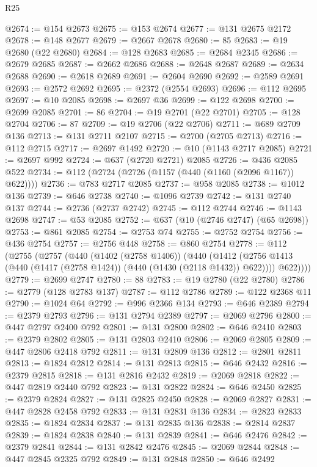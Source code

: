 \begin{lexlean}{R25}
\begin{coremodule}
@2674 := @154 @2673
@2675 := @153 @2674
@2677 := @131 @2675 @2172
@2678 := @148 @2677
@2679 := @2667 @2678
@2680 := 85
@2683 := @19 @2680 (@22 @2680)
@2684 := @128 @2683
@2685 := @2684 @2345
@2686 := @2679 @2685
@2687 := @2662 @2686
@2688 := @2648 @2687
@2689 := @2634 @2688
@2690 := @2618 @2689
@2691 := @2604 @2690
@2692 := @2589 @2691
@2693 := @2572 @2692
@2695 := @2372 (@2554 @2693)
@2696 := @112 @2695
@2697 := @10 @2085
@2698 := @2697 @36
@2699 := @122 @2698
@2700 := @2699 @2085
@2701 := 86
@2704 := @19 @2701 (@22 @2701)
@2705 := @128 @2704
@2706 := 87
@2709 := @19 @2706 (@22 @2706)
@2711 := @689 @2709 @136
@2713 := @131 @2711 @2107
@2715 := @2700 (@2705 @2713)
@2716 := @112 @2715
@2717 := @2697 @1492
@2720 := @10 (@1143 @2717 @2085)
@2721 := @2697 @992
@2724 := @637 (@2720 @2721) @2085
@2726 := @436 @2085 @522
@2734 := @112 (@2724 (@2726 (@1157 (@440 (@1160 (@2096 @1167)) @622))))
@2736 := @783 @2717 @2085
@2737 := @958 @2085
@2738 := @1012 @136
@2739 := @646 @2738
@2740 := @1096 @2739
@2742 := @131 @2740 @137
@2744 := @2736 (@2737 @2742)
@2745 := @112 @2744
@2746 := @1143 @2698
@2747 := @53 @2085
@2752 := @637 (@10 (@2746 @2747) (@65 @2698))
@2753 := @861 @2085
@2754 := @2753 @74
@2755 := @2752 @2754
@2756 := @436 @2754
@2757 := @2756 @448
@2758 := @860 @2754
@2778 := @112
    (@2755
      (@2757
        (@440
          (@1402 (@2758 @1406))
          (@440
            (@1412 (@2756 @1413 (@440 (@1417 (@2758 @1424)) (@440 (@1430 (@2118 @1432)) @622))))
            @622))))
@2779 := @2699 @2747
@2780 := 88
@2783 := @19 @2780 (@22 @2780)
@2786 := @2779 (@128 @2783 @137)
@2787 := @112 @2786
@2789 := @122 @2368 @11
@2790 := @1024 @64
@2792 := @996 @2366 @134
@2793 := @646 @2389
@2794 := @2379 @2793
@2796 := @131 @2794 @2389
@2797 := @2069 @2796
@2800 := @447 @2797 @2400 @792
@2801 := @131 @2800
@2802 := @646 @2410
@2803 := @2379 @2802
@2805 := @131 @2803 @2410
@2806 := @2069 @2805
@2809 := @447 @2806 @2418 @792
@2811 := @131 @2809 @136
@2812 := @2801 @2811
@2813 := @1824 @2812
@2814 := @131 @2813
@2815 := @646 @2432
@2816 := @2379 @2815
@2818 := @131 @2816 @2432
@2819 := @2069 @2818
@2822 := @447 @2819 @2440 @792
@2823 := @131 @2822
@2824 := @646 @2450
@2825 := @2379 @2824
@2827 := @131 @2825 @2450
@2828 := @2069 @2827
@2831 := @447 @2828 @2458 @792
@2833 := @131 @2831 @136
@2834 := @2823 @2833
@2835 := @1824 @2834
@2837 := @131 @2835 @136
@2838 := @2814 @2837
@2839 := @1824 @2838
@2840 := @131 @2839
@2841 := @646 @2476
@2842 := @2379 @2841
@2844 := @131 @2842 @2476
@2845 := @2069 @2844
@2848 := @447 @2845 @2325 @792
@2849 := @131 @2848
@2850 := @646 @2492

\end{coremodule}
\end{lexlean}
